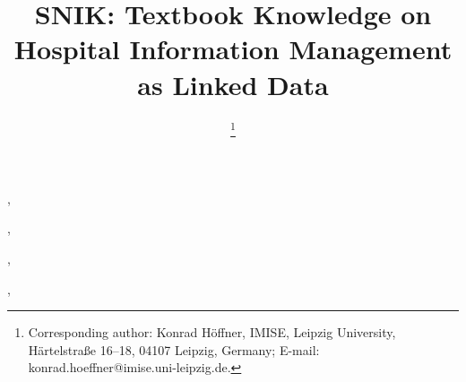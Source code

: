 \documentclass{IOS-Book-Article}     %
\def\hb{\hbox to 11.5 cm{}}
\begin{document}
\pagestyle{headings}
\def\thepage{}

\begin{frontmatter}              %


\title{SNIK: Textbook Knowledge on Hospital Information Management as Linked Data}

\markboth{}{May 2022\hb}

\author[A]{ %
\thanks{Corresponding author: Konrad Höffner, IMISE, Leipzig University,
Härtelstraße 16--18, 04107 Leipzig, Germany; E-mail: konrad.hoeffner@imise.uni-leipzig.de.}},
\author[A]{ },
\author[A]{ },
\author[A]{ },
\author[A]{ }
\address[A]{IMISE, Leipzig University, Germany}


\end{frontmatter}
\end{document}
